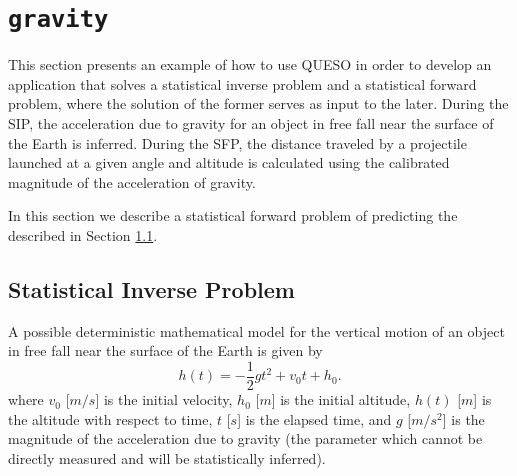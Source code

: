 
\section{\texttt{gravity}}\label{sec:example_gravity}

This section presents an example of how to use QUESO in order to develop an application that solves a statistical inverse problem and
a statistical forward problem, where the solution of the former serves as input to the later. During the SIP, the acceleration due to gravity for an object in free fall near the surface of the Earth is inferred. During the SFP, the distance traveled by a projectile launched at a given angle and altitude is calculated using the calibrated magnitude of the acceleration of gravity.


In this section we describe a statistical forward problem  of predicting the  described in Section \ref{sec:gravity-ip}.

\subsection{Statistical Inverse Problem}\label{sec:gravity-ip}



A possible deterministic mathematical model for the vertical motion of an object in free fall near the surface of the Earth is given by
\begin{equation}\label{eq:gravity01}
h(t)=-\frac{1}{2} g t^2 + v_0 t + h_0.
\end{equation}
where
$v_0$ [$m/s$] is the initial velocity,
$h_0$ [$m$] is the initial altitude,
$h(t)$ [$m$] is the altitude with respect to time,
$t$ [$s$] is the elapsed time, and
$g$ [$m/s^2$] is the magnitude of the acceleration due to gravity (the parameter which cannot be directly measured and will be statistically inferred).




